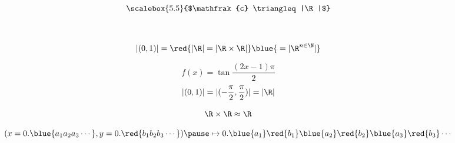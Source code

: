 %
%
%
%
%

\begin{frame}{}
  \[
    \scalebox{5.5}{$\mathfrak{c} \triangleq |\R|$}
  \]

  \pause
  \vspace{0.50cm}
  \begin{center}
     \\[8pt]
  \end{center}
\end{frame}

\begin{frame}{}
  \begin{theorem}[$|\R|$ (Cantor 1877)]
    \[
      |(0,1)| = \red{|\R| = |\R \times \R|} \blue{\;= |\R^{n \in \N}|}
    \]
  \end{theorem}

  \pause
  \vspace{0.50cm}
  \[
    f(x) = \tan \frac{(2x-1)\pi}{2}
  \]
  \[
    |(0,1)| = |(-\frac{\pi}{2}, \frac{\pi}{2})| = |\R|
  \]
\end{frame}

\begin{frame}{}
  \[
    \R \times \R \approx \R
  \]

  \pause
  \[
    (x = 0.\blue{a_1 a_2 a_3 \cdots}, y = 0.\red{b_1 b_2 b_3 \cdots}) \pause \mapsto 0.\blue{a_1}\red{b_1}\blue{a_2}\red{b_2}\blue{a_3}\red{b_3}\cdots
  \]

  \pause

  \begin{center}
    \href{https://www.maa.org/sites/default/files/pdf/pubs/AMM-March11\_Cantor.pdf}{}
  \end{center}
\end{frame}

